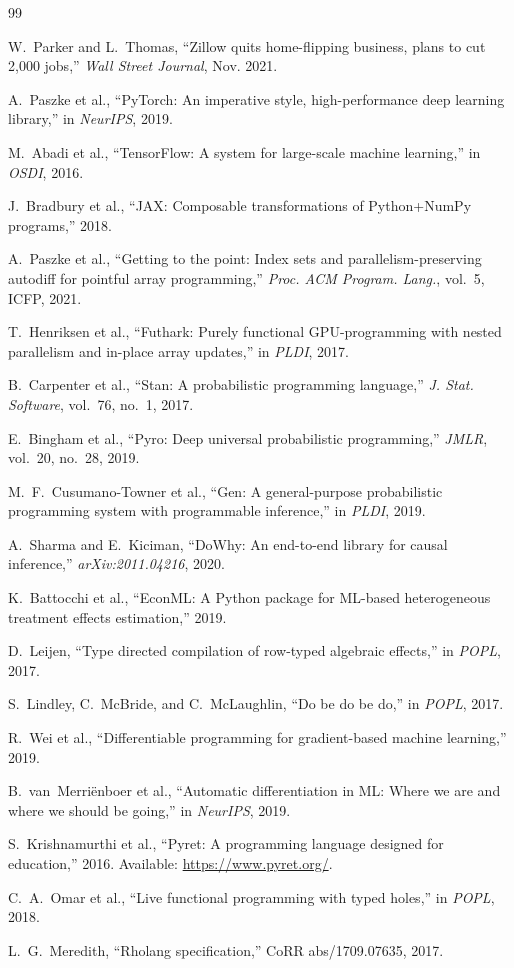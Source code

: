 \documentclass[11pt,a4paper]{article}
\begin{document}
\begin{thebibliography}{99}

W.~Parker and L.~Thomas, ``Zillow quits home-flipping business, plans to cut 2,000 jobs,'' \emph{Wall Street Journal}, Nov. 2021.

A.~Paszke et al., ``PyTorch: An imperative style, high-performance deep learning library,'' in \emph{NeurIPS}, 2019.

M.~Abadi et al., ``TensorFlow: A system for large-scale machine learning,'' in \emph{OSDI}, 2016.

J.~Bradbury et al., ``JAX: Composable transformations of Python+NumPy programs,'' 2018.

A.~Paszke et al., ``Getting to the point: Index sets and parallelism-preserving autodiff for pointful array programming,'' \emph{Proc. ACM Program. Lang.}, vol.~5, ICFP, 2021.

T.~Henriksen et al., ``Futhark: Purely functional GPU-programming with nested parallelism and in-place array updates,'' in \emph{PLDI}, 2017.

B.~Carpenter et al., ``Stan: A probabilistic programming language,'' \emph{J. Stat. Software}, vol.~76, no.~1, 2017.

E.~Bingham et al., ``Pyro: Deep universal probabilistic programming,'' \emph{JMLR}, vol.~20, no.~28, 2019.

M.~F.~Cusumano-Towner et al., ``Gen: A general-purpose probabilistic programming system with programmable inference,'' in \emph{PLDI}, 2019.

A.~Sharma and E.~Kiciman, ``DoWhy: An end-to-end library for causal inference,'' \emph{arXiv:2011.04216}, 2020.

K.~Battocchi et al., ``EconML: A Python package for ML-based heterogeneous treatment effects estimation,'' 2019.

D.~Leijen, ``Type directed compilation of row-typed algebraic effects,'' in \emph{POPL}, 2017.

S.~Lindley, C.~McBride, and C.~McLaughlin, ``Do be do be do,'' in \emph{POPL}, 2017.

R.~Wei et al., ``Differentiable programming for gradient-based machine learning,'' 2019.

B.~van~Merri\"enboer et al., ``Automatic differentiation in ML: Where we are and where we should be going,'' in \emph{NeurIPS}, 2019.

S.~Krishnamurthi et al., ``Pyret: A programming language designed for education,'' 2016. Available: \url{https://www.pyret.org/}.

C.~A.~Omar et al., ``Live functional programming with typed holes,'' in \emph{POPL}, 2018.

L.~G.~Meredith, ``Rholang specification,'' CoRR abs/1709.07635, 2017.

\end{thebibliography}
\end{document}
